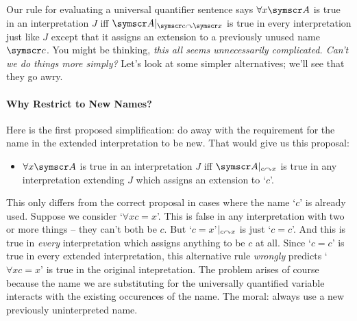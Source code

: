 Our rule for evaluating a universal quantifier sentence says $\forall x \meta{A}$ is true in an interpretation $J$ iff $\meta{A}\subs{\meta{c}}{\meta{x}}$ is true in every interpretation just like $J$ except that it assigns an extension to a previously unused name $\meta{c}$. You might be thinking, \emph{this all seems unnecessarily complicated. Can't we do things more simply?} Let's look at some simpler alternatives; we'll see that they go awry.

\paragraph{Why Restrict to New Names?} Here is the first proposed simplification: do away with the requirement for the name in the extended interpretation to be new. That would give us this proposal: \begin{itemize}
	\item $\forall x\meta{A}$ is true in an interpretation $J$ iff $\meta{A}\subs{c}{x}$ is true in any interpretation extending $J$ which assigns an extension to `$c$'. 
\end{itemize}
This only differs from the correct proposal in cases where the name `$c$' is already used. Suppose we consider `$\forall x c=x$'. This is false in any interpretation with two or more things – they can't both be $c$.  But `$c=x$'$\vert_{c\curvearrowright x}$ is just `$c=c$'. And this is true in \emph{every} interpretation which assigns anything to be $c$ at all.  Since `$c=c$' is true in every extended interpretation, this alternative rule \emph{wrongly} predicts `$\forall x c=x$' is true in the original intepretation. The problem arises of course because the name we are substituting for the universally quantified variable interacts with the existing occurences of the name.  The moral: always use a new previously uninterpreted name.




